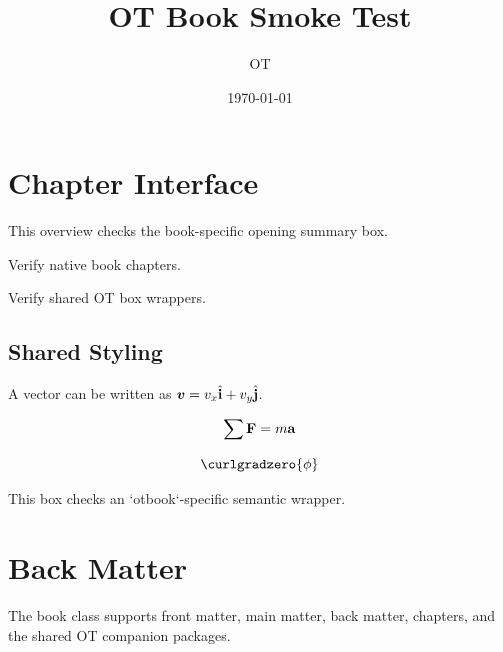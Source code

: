 \documentclass[12pt]{otbook}
\title{OT Book Smoke Test}
\author{OT}
\date{\today}
\begin{document}
\frontmatter
\hypersetup{pageanchor=false}
\makeotbooktitle
{}
\hypersetup{pageanchor=true}
\tableofcontents

\mainmatter

\chapter{Chapter Interface}


\begin{chapteroverview}
  This overview checks the book-specific opening summary box.
\end{chapteroverview}

\begin{chaptergoals}
  \item Verify native book chapters.
  \item Verify shared OT box wrappers.
\end{chaptergoals}

\section{Shared Styling}

\begin{definitionbox}[Vector]
  A vector can be written as \(\boldsymbol{v}=v_x\hat{\mathbf{i}}+v_y\hat{\mathbf{j}}\).
\end{definitionbox}

\begin{formulabox}
  \[
    \sum\mathbf{F}=m\mathbf{a}
  \]
\end{formulabox}

\begin{identitybox}
  \[
    \curlgradzero{\phi}
  \]
\end{identitybox}

\begin{reflectionbox}
  This box checks an `otbook`-specific semantic wrapper.
\end{reflectionbox}

\backmatter

\chapter{Back Matter}

\begin{summarybox}
  The book class supports front matter, main matter, back matter, chapters, and
  the shared OT companion packages.
\end{summarybox}
\end{document}
